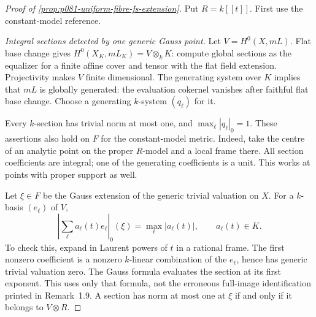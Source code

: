 \begin{proof}[Proof of \cref{prop:p081-uniform-fibre-fs-extension}]
Put \(R=k[[t]]\). First use the constant-model reference.

\emph{Integral sections detected by one generic Gauss point.}
Let \(V=H^0(X,mL)\). Flat base change gives
\(H^0(X_K,mL_K)=V\otimes_k K\): compute global sections as the
equalizer for a finite affine cover and tensor with the flat field
extension. Projectivity makes \(V\) finite dimensional. The generating
system over \(K\) implies that \(mL\) is globally generated: the
evaluation cokernel vanishes after faithful flat base change. Choose a
generating \(k\)-system \((q_\ell)\) for it.

Every \(k\)-section has trivial norm at most one, and
\(\max_\ell|q_\ell|_0=1\). These assertions also hold on \(F\) for
the constant-model metric. Indeed, take the centre of an analytic point
on the proper \(R\)-model and a local frame there. All section
coefficients are integral; one of the generating coefficients is a unit.
This works at points with proper support as well.

Let \(\xi\in F\) be the Gauss extension of the generic trivial
valuation on \(X\). For a \(k\)-basis \((e_\ell)\) of \(V\),
\begin{equation}\label{eq:p081-uniform-integral-norm}
 \left|\sum_\ell a_\ell(t)e_\ell\right|_0(\xi)
          =\max_\ell|a_\ell(t)|,\qquad a_\ell(t)\in K.
\end{equation}
To check this, expand in Laurent powers of \(t\) in a rational frame.
The first nonzero coefficient is a nonzero \(k\)-linear combination of
the \(e_\ell\), hence has generic trivial valuation zero. The Gauss
formula \cite[\S1.3]{BJ22} evaluates the section at its first exponent.
This uses only that formula, not the erroneous full-image identification
printed in Remark~1.9. A section has norm at most one at \(\xi\) if
and only if it belongs to \(V\otimes R\).


\end{proof}
